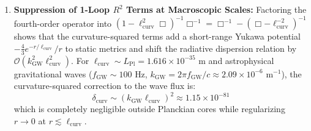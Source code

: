\documentclass[10pt,aps,prd,twocolumn,superscriptaddress,nofootinbib,floatfix,longbibliography,showkeys]{revtex4-2}
\begin{document}
\begin{enumerate}
  \item \textbf{Suppression of 1-Loop $R^2$ Terms at Macroscopic Scales:} Factoring the fourth-order operator into $(1 - \ell_{\text{curv}}^2\Box)^{-1}\Box^{-1} = \Box^{-1} - (\Box - \ell_{\text{curv}}^{-2})^{-1}$ shows that the curvature-squared terms add a short-range Yukawa potential $-\frac{4}{3}e^{-r/\ell_{\text{curv}}}/r$ to static metrics and shift the radiative dispersion relation by $\mathcal{O}(k_{\text{GW}}^2 \ell_{\text{curv}}^2)$. For $\ell_{\text{curv}} \sim L_{\text{Pl}} = 1.616 \times 10^{-35}\text{ m}$ and astrophysical gravitational waves ($f_{\text{GW}} \sim 100\text{ Hz}$, $k_{\text{GW}} = 2\pi f_{\text{GW}}/c \approx 2.09 \times 10^{-6}\text{ m}^{-1}$), the curvature-squared correction to the wave flux is:
\begin{equation}
\delta_{\text{curv}} \sim \left(k_{\text{GW}} \ell_{\text{curv}}\right)^2 \approx 1.15 \times 10^{-81}
\end{equation}
  which is completely negligible outside Planckian cores while regularizing $r \to 0$ at $r \lesssim \ell_{\text{curv}}$.


\end{enumerate}
\end{document}
